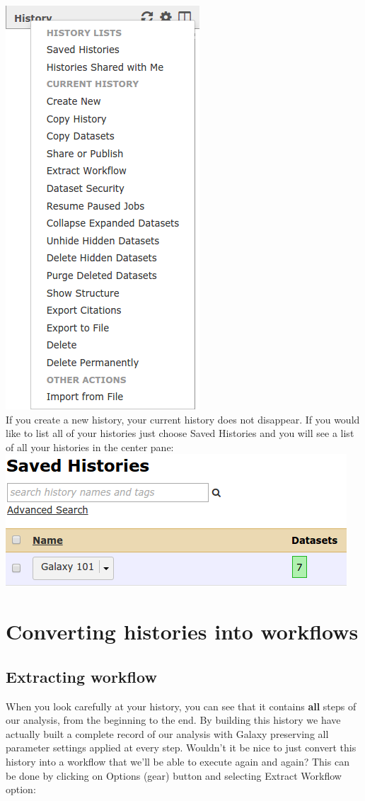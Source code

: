 \documentclass[11pt,a4paper]{article}
\begin{document}
\includegraphics[scale=0.65]{figures/101_22}\\
If you create a new history, your current history does not disappear. If you would like to list all of your histories just choose Saved Histories and you will see a list of all your histories in the center pane:\\

\includegraphics[scale=0.65]{figures/101_23}\\
\section{Converting histories into workflows}
\subsection{Extracting workflow}
When you look carefully at your history, you can see that it contains \textbf{all} steps of our analysis, from the beginning to the end.
By building this history we have actually built a complete record of our analysis with Galaxy preserving all parameter settings applied at every step. Wouldn't it be nice to just convert this history into a workflow that we'll be able to execute again and again? This can be done by clicking on Options (gear) button and selecting Extract Workflow option:\\
\end{document}
